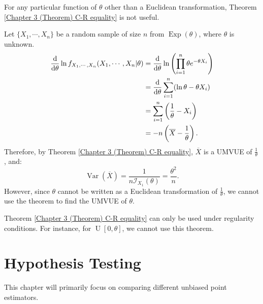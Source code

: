 \documentclass{huhtakm-template-book-v2}
\DeclareMathOperator{\Var}{Var}
\DeclareMathOperator{\Exp}{Exp}
\DeclareMathOperator{\U}{U}
\begin{document}
    \begin{rem}
        For any particular function of $\theta$ other than a Euclidean transformation, Theorem \ref{Chapter 3 (Theorem) C-R equality} is not useful.
    \end{rem}
    \begin{eg}
        Let $\{X_{1},\cdots,X_{n}\}$ be a random sample of size $n$ from $\Exp(\theta)$, where $\theta$ is unknown.
        \begin{align*}
            \odv*{\ln{f_{X_{1},\cdots,X_{n}}(X_{1},\cdots,X_{n}|\theta)}}{\theta}&=\odv*{\ln\left(\prod_{i=1}^{n}\theta e^{-\theta X_{i}}\right)}{\theta}\\
            &=\odv*{\sum_{i=1}^{n}(\ln{\theta}-\theta X_{i})}{\theta}\\
            &=\sum_{i=1}^{n}\left(\frac{1}{\theta}-X_{i}\right)\\
            &=-n\left(\overline{X}-\frac{1}{\theta}\right).
        \end{align*}
        Therefore, by Theorem \ref{Chapter 3 (Theorem) C-R equality}, $\overline{X}$ is a UMVUE of $\frac{1}{\theta}$, and:
        \begin{equation*}
            \Var(\overline{X})=\frac{1}{n\mathcal{I}_{X_{1}}(\theta)}=\frac{\theta^{2}}{n}.
        \end{equation*}
        However, since $\theta$ cannot be written as a Euclidean transformation of $\frac{1}{\theta}$, we cannot use the theorem to find the UMVUE of $\theta$.
    \end{eg}
    \begin{rem}
        Theorem \ref{Chapter 3 (Theorem) C-R equality} can only be used under regularity conditions. For instance, for $\U[0,\theta]$, we cannot use this theorem.
    \end{rem}

\chapter{Hypothesis Testing}
    This chapter will primarily focus on comparing different unbiased point estimators. 
\end{document}
